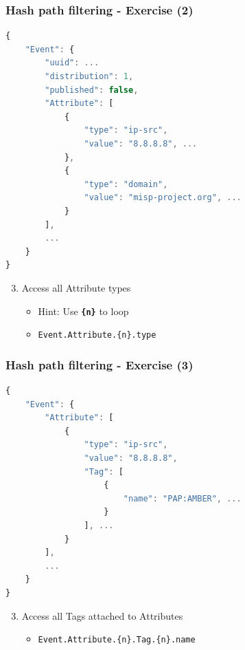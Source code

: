 \begin{frame}[fragile]
    \frametitle{Hash path filtering - Exercise (2)}

\begin{lstlisting}[language=javascript,firstnumber=1]
{
    "Event": {
        "uuid": ...
        "distribution": 1,
        "published": false,
        "Attribute": [
            {
                "type": "ip-src",
                "value": "8.8.8.8", ...
            },
            {
                "type": "domain",
                "value": "misp-project.org", ...
            }
        ],
        ...
    }
}
\end{lstlisting}
    \begin{enumerate}
        \setcounter{enumi}{2}
        \item Access all Attribute types
        \begin{itemize}
            \item Hint: Use \texttt{\bf \{n\}} to loop 
            \pause
            \item \texttt{Event.Attribute.\{n\}.type}
        \end{itemize}
    \end{enumerate}
\end{frame}

\begin{frame}[fragile]
    \frametitle{Hash path filtering - Exercise (3)}

\begin{lstlisting}[language=javascript,firstnumber=1]
{
    "Event": {
        "Attribute": [
            {
                "type": "ip-src",
                "value": "8.8.8.8",
                "Tag": [
                    {
                        "name": "PAP:AMBER", ...
                    }
                ], ...
            }
        ],
        ...
    }
}
\end{lstlisting}
    \begin{enumerate}
        \setcounter{enumi}{2}
        \item Access all Tags attached to Attributes
        \pause
        \begin{itemize}
            \item \texttt{Event.Attribute.\{n\}.Tag.\{n\}.name}
        \end{itemize}
    \end{enumerate}
\end{frame}



